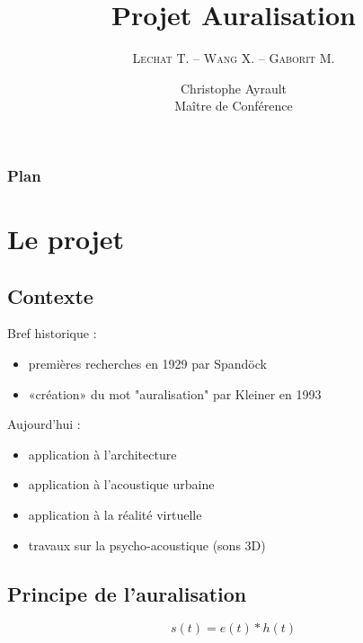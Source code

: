 \documentclass{beamer}
\title[Projet Auralisation]{Projet Auralisation}
\institute{L2 SPI TD2\\Novembre 2012 -- Janvier 2013}
\author{\textsc{Lechat} T. -- \textsc{Wang} X. -- \textsc{Gaborit} M.}
\date{Christophe Ayrault\\Maître de Conférence}
\begin{document}
\begin{frame}
\titlepage
\end{frame}

\begin{frame}
\frametitle{Plan}
\tableofcontents
\end{frame}

\section{Le projet}
\subsection{Contexte}

\begin{frame}

Bref historique :
\begin{itemize}
    \item premières recherches en 1929 par Spandöck
    \item «création» du mot "auralisation" par Kleiner en 1993
\end{itemize}

Aujourd'hui :

\begin{itemize}
    \item application à l'architecture
    \item application à l'acoustique urbaine
    \item application à la réalité virtuelle
    \item travaux sur la psycho-acoustique (sons 3D)
\end{itemize}

\end{frame}

\subsection{Principe de l'auralisation}

\begin{frame}

\begin{figure}
\end{figure}

\begin{equation*}
s(t) = e(t)\ast h(t)
\end{equation*}

\end{frame}
\end{document}

